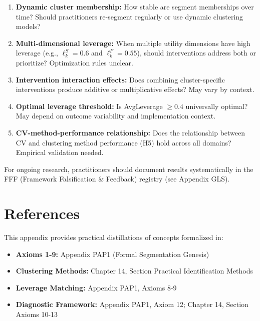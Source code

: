 \begin{enumerate}
\item \textbf{Dynamic cluster membership:} How stable are segment memberships over time? Should practitioners re-segment regularly or use dynamic clustering models?

\item \textbf{Multi-dimensional leverage:} When multiple utility dimensions have high leverage (e.g., $\ell_k^S = 0.6$ and $\ell_k^F = 0.55$), should interventions address both or prioritize? Optimization rules unclear.

\item \textbf{Intervention interaction effects:} Does combining cluster-specific interventions produce additive or multiplicative effects? May vary by context.

\item \textbf{Optimal leverage threshold:} Is AvgLeverage $\geq 0.4$ universally optimal? May depend on outcome variability and implementation context.

\item \textbf{CV-method-performance relationship:} Does the relationship between CV and clustering method performance (H5) hold across all domains? Empirical validation needed.
\end{enumerate}

For ongoing research, practitioners should document results systematically in the FFF (Framework Falsification \& Feedback) registry (see Appendix GLS).

\vspace{1em}


\section{References}
\label{sec:h-references}

This appendix provides practical distillations of concepts formalized in:

\begin{itemize}[nosep]
\item \textbf{Axioms 1-9:} Appendix PAP1 (Formal Segmentation Genesis)
\item \textbf{Clustering Methods:} Chapter 14, Section Practical Identification Methods
\item \textbf{Leverage Matching:} Appendix PAP1, Axioms 8-9
\item \textbf{Diagnostic Framework:} Appendix PAP1, Axiom 12; Chapter 14, Section Axioms 10-13
\end{itemize}

